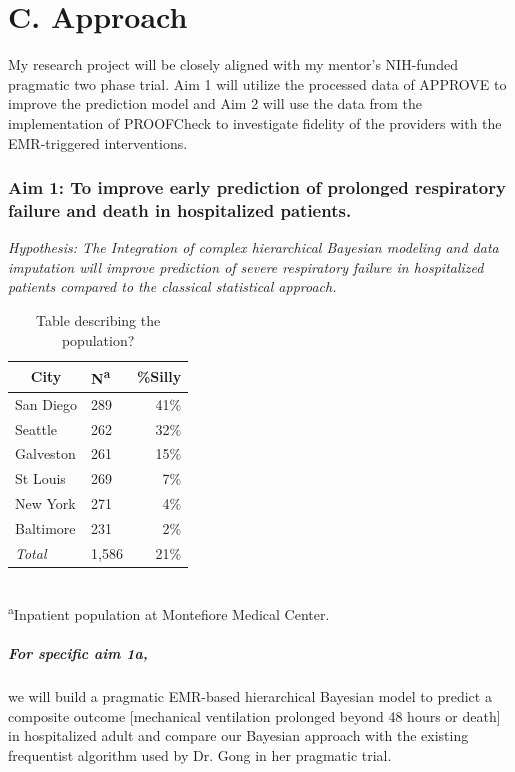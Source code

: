 \documentclass[11pt,notitlepage]{article}
\begin{document}
\section*{C. Approach}
My research project will be closely aligned with my mentor's NIH-funded pragmatic two phase trial. Aim 1 will utilize the processed data of APPROVE to improve the prediction model and Aim 2 will use the data from the implementation of PROOFCheck to investigate fidelity of the providers with the EMR-triggered interventions.

\subsubsection*{Aim 1: To improve early prediction of prolonged respiratory failure and death in hospitalized patients.}

\begin{flushleft}
\textit{Hypothesis: The Integration of complex hierarchical Bayesian modeling and data imputation will improve prediction of severe respiratory failure in hospitalized patients compared to the classical statistical approach.}
\end{flushleft}

\begin{table} %
\caption{Table describing the population?}
\begin{center}
\begin{tabular}{l l r}
\toprule
\multicolumn{1}{c}{City} & {N\textsuperscript{a}} & {\%Silly}\\
\midrule
San Diego & 289 & 41\%\\
Seattle & 262 & 32\%\\
Galveston & 261 & 15\%\\
St Louis & 269 & 7\%\\
New York & 271 & 4\%\\
Baltimore & 231 & 2\%\\
\emph{Total} & 1,586 & 21\%\\
\hline
\end{tabular}\\
\footnotesize\textsuperscript{a}{Inpatient population at Montefiore Medical Center.}
\end{center}
\label{Algorithm}
\end{table}

\subparagraph*{For specific aim 1a,} we will build a pragmatic EMR-based hierarchical Bayesian model to predict a composite outcome [mechanical ventilation prolonged beyond 48 hours or death] in hospitalized adult and compare our Bayesian approach with the existing frequentist algorithm used by Dr. Gong in her pragmatic trial.
\end{document}
